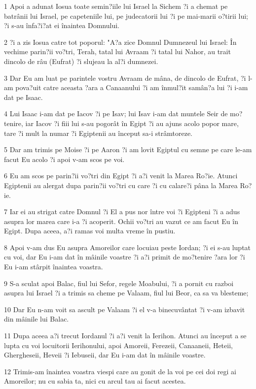 \par 1 Apoi a adunat Iosua toate semin?iile lui Israel la Sichem ?i a chemat pe batrânii lui Israel, pe capeteniile lui, pe judecatorii lui ?i pe mai-marii o?tirii lui; ?i s-au înfa?i?at ei înaintea Domnului.
\par 2 ?i a zis Iosua catre tot poporul: "A?a zice Domnul Dumnezeul lui Israel: În vechime parin?ii vo?tri, Terah, tatal lui Avraam ?i tatal lui Nahor, au trait dincolo de râu (Eufrat) ?i slujeau la al?i dumnezei.
\par 3 Dar Eu am luat pe parintele vostru Avraam de mâna, de dincolo de Eufrat, ?i l-am pova?uit catre aceasta ?ara a Canaanului ?i am înmul?it samân?a lui ?i i-am dat pe Isaac.
\par 4 Lui Isaac i-am dat pe Iacov ?i pe Isav; lui Isav i-am dat muntele Seir de mo?tenire, iar Iacov ?i fiii lui s-au pogorât în Egipt ?i au ajuns acolo popor mare, tare ?i mult la numar ?i Egiptenii au început sa-i strâmtoreze.
\par 5 Dar am trimis pe Moise ?i pe Aaron ?i am lovit Egiptul cu semne pe care le-am facut Eu acolo ?i apoi v-am scos pe voi.
\par 6 Eu am scos pe parin?ii vo?tri din Egipt ?i a?i venit la Marea Ro?ie. Atunci Egiptenii au alergat dupa parin?ii vo?tri cu care ?i cu calare?i pâna la Marea Ro?ie.
\par 7 Iar ei au strigat catre Domnul ?i El a pus nor între voi ?i Egipteni ?i a adus asupra lor marea care i-a ?i acoperit. Ochii vo?tri au vazut ce am facut Eu în Egipt. Dupa aceea, a?i ramas voi multa vreme în pustiu.
\par 8 Apoi v-am dus Eu asupra Amoreilor care locuiau peste Iordan; ?i ei s-au luptat cu voi, dar Eu i-am dat în mâinile voastre ?i a?i primit de mo?tenire ?ara lor ?i Eu i-am stârpit înaintea voastra.
\par 9 S-a sculat apoi Balac, fiul lui Sefor, regele Moabului, ?i a pornit cu razboi asupra lui Israel ?i a trimis sa cheme pe Valaam, fiul lui Beor, ca sa va blesteme;
\par 10 Dar Eu n-am voit sa ascult pe Valaam ?i el v-a binecuvântat ?i v-am izbavit din mâinile lui Balac.
\par 11 Dupa aceea a?i trecut Iordanul ?i a?i venit la Ierihon. Atunci au început a se lupta cu voi locuitorii Ierihonului, apoi Amoreii, Ferezeii, Canaaneii, Heteii, Ghergheseii, Heveii ?i Iebuseii, dar Eu i-am dat în mâinile voastre.
\par 12 Trimis-am înaintea voastra viespi care au gonit de la voi pe cei doi regi ai Amoreilor; nu cu sabia ta, nici cu arcul tau ai facut acestea.
